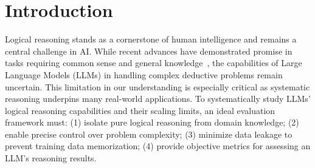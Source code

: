  
\vspace{-0.2cm}
\section{Introduction}
\vspace{-0.2cm}
\label{sec:intro} 




Logical reasoning stands as a cornerstone of human intelligence and remains a central challenge in AI. While recent advances have demonstrated promise in tasks requiring common sense and general knowledge~\citep{brown2020language,chowdhery2022palm,bubeck2023sparks}, the capabilities of Large Language Models (LLMs) in handling complex deductive problems remain uncertain. 
This limitation in our understanding is especially critical as systematic reasoning underpins many real-world applications. 
To systematically study LLMs' logical reasoning capabilities and their scaling limits,
an ideal evaluation framework must:
(1) isolate pure logical reasoning from domain knowledge;
(2) enable precise control over problem complexity;
(3) minimize data leakage to prevent training data memorization; %
(4) provide objective metrics for assessing an LLM's reasoning results.

